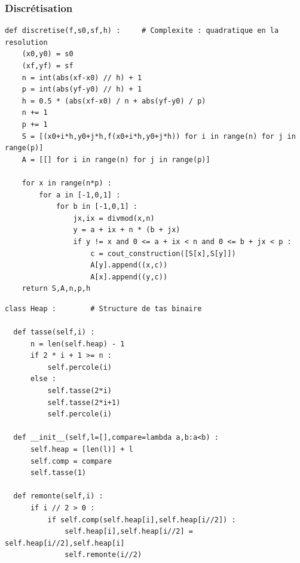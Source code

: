 \documentclass{beamer}[11pt]
\begin{document}
		\begin{frame}[containsverbatim]
			\frametitle{Discrétisation}

\begin{lstlisting}
def discretise(f,s0,sf,h) :		# Complexite : quadratique en la resolution
    (x0,y0) = s0
    (xf,yf) = sf
    n = int(abs(xf-x0) // h) + 1
    p = int(abs(yf-y0) // h) + 1
    h = 0.5 * (abs(xf-x0) / n + abs(yf-y0) / p)
    n += 1
    p += 1
    S = [(x0+i*h,y0+j*h,f(x0+i*h,y0+j*h)) for i in range(n) for j in range(p)]
    A = [[] for i in range(n) for j in range(p)]

    for x in range(n*p) :
        for a in [-1,0,1] :
            for b in [-1,0,1] :
                jx,ix = divmod(x,n)
                y = a + ix + n * (b + jx)
                if y != x and 0 <= a + ix < n and 0 <= b + jx < p :
                    c = cout_construction([S[x],S[y]])
                    A[y].append((x,c))
                    A[x].append((y,c))
    return S,A,n,p,h
\end{lstlisting}
		\end{frame}


		\begin{frame}[containsverbatim]
\begin{lstlisting}
class Heap :		# Structure de tas binaire

  def tasse(self,i) :
      n = len(self.heap) - 1
      if 2 * i + 1 >= n :
          self.percole(i)
      else :
          self.tasse(2*i)
          self.tasse(2*i+1)
          self.percole(i)

  def __init__(self,l=[],compare=lambda a,b:a<b) :
      self.heap = [len(l)] + l
      self.comp = compare
      self.tasse(1)

  def remonte(self,i) :
      if i // 2 > 0 :
          if self.comp(self.heap[i],self.heap[i//2]) :
              self.heap[i],self.heap[i//2] = self.heap[i//2],self.heap[i]
              self.remonte(i//2)
\end{lstlisting}
		\end{frame}
\end{document}
